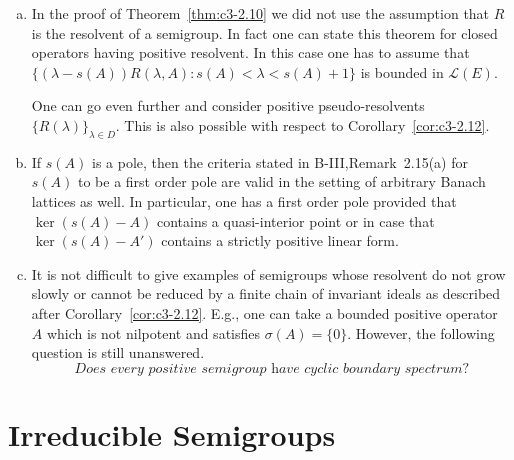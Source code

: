 \begin{remarks}\label{rem:c3-2.15}
\begin{enumerate}[(a), wide]	
	\item 
	In the proof of Theorem~\ref{thm:c3-2.10} we did not use the assumption that $R$ is the resolvent of a semigroup.
	In fact one can state this theorem for closed operators having positive resolvent.
	In this case one has to assume that $\{(\lambda-s(A))R(\lambda,A) : s(A) < \lambda < s(A)+1\}$ is bounded in $\mathcal{L}(E)$.
	
	One can go even further and consider positive pseudo-resolvents $\{R(\lambda)\}_{\lambda\in D}$.
	This is also possible with respect to Corollary~\ref{cor:c3-2.12}.
	
	\item 
	If $s(A)$ is a pole, then the criteria stated in B-III,Remark~2.15(a) for $s(A)$ to be a first order pole are valid in the setting of arbitrary Banach lattices as well.
	In particular, one has a first order pole provided that $\ker(s(A) - A)$ contains a quasi-interior point or in case that $\ker(s(A) - A')$ contains a strictly positive linear form.
	
	\item 
	It is not difficult to give examples of semigroups whose resolvent do not grow slowly or cannot be reduced by a finite chain of invariant ideals as described after Corollary~\ref{cor:c3-2.12}.
	E.g., one can take a bounded positive operator $A$ which is not nilpotent and satisfies $\sigma(A) = \{0\}$.
	However, the following question is still unanswered.
	\begin{equation*}
		\textit{Does every positive semigroup have cyclic boundary spectrum?}
	\end{equation*}
\end{enumerate}
\end{remarks}
%
%
\section{Irreducible Semigroups}\label{sec:c3-3}

